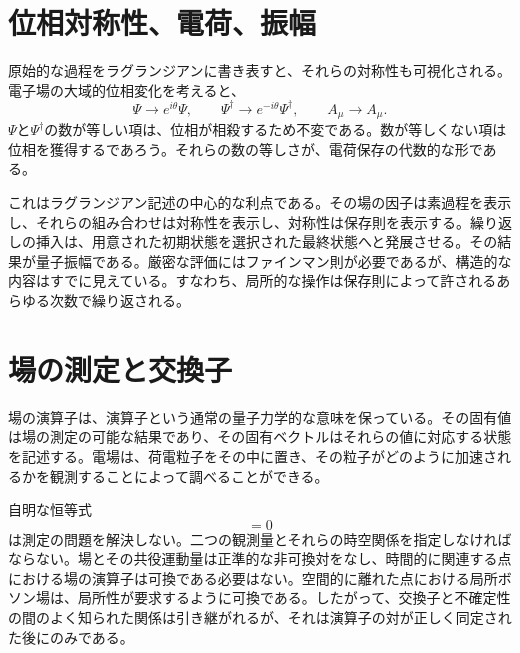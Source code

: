 \section{位相対称性、電荷、振幅}

原始的な過程をラグランジアンに書き表すと、それらの対称性も可視化される。電子場の大域的位相変化を考えると、
\begin{equation}
\Psi\longrightarrow e^{i\theta}\Psi,
\qquad
\Psi^\dagger\longrightarrow e^{-i\theta}\Psi^\dagger,
\qquad
A_\mu\longrightarrow A_\mu.
\end{equation}
\(\Psi\)と\(\Psi^\dagger\)の数が等しい項は、位相が相殺するため不変である。数が等しくない項は位相を獲得するであろう。それらの数の等しさが、電荷保存の代数的な形である。

これはラグランジアン記述の中心的な利点である。その場の因子は素過程を表示し、それらの組み合わせは対称性を表示し、対称性は保存則を表示する。繰り返しの挿入は、用意された初期状態を選択された最終状態へと発展させる。その結果が量子振幅である。厳密な評価にはファインマン則が必要であるが、構造的な内容はすでに見えている。すなわち、局所的な操作は保存則によって許されるあらゆる次数で繰り返される。

\section{場の測定と交換子}

場の演算子は、演算子という通常の量子力学的な意味を保っている。その固有値は場の測定の可能な結果であり、その固有ベクトルはそれらの値に対応する状態を記述する。電場は、荷電粒子をその中に置き、その粒子がどのように加速されるかを観測することによって調べることができる。

\begin{classroomqa}
\end{classroomqa}

自明な恒等式
\begin{equation}
[\phi(x),\phi(x)]=0
\end{equation}
は測定の問題を解決しない。二つの観測量とそれらの時空関係を指定しなければならない。場とその共役運動量は正準的な非可換対をなし、時間的に関連する点における場の演算子は可換である必要はない。空間的に離れた点における局所ボソン場は、局所性が要求するように可換である。したがって、交換子と不確定性の間のよく知られた関係は引き継がれるが、それは演算子の対が正しく同定された後にのみである。

